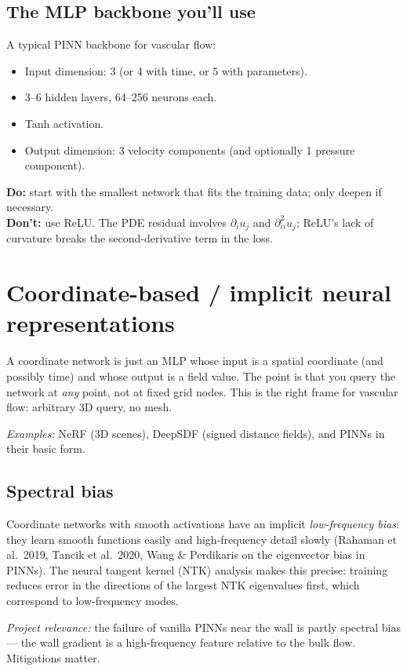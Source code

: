 \documentclass[11pt]{article}
\begin{document}
\subsection*{The MLP backbone you'll use}
A typical PINN backbone for vascular flow:
\begin{itemize}[noitemsep]
\item Input dimension: 3 (or 4 with time, or 5 with parameters).
\item 3--6 hidden layers, 64--256 neurons each.
\item Tanh activation.
\item Output dimension: 3 velocity components (and optionally 1 pressure component).
\end{itemize}

\textbf{Do:} start with the smallest network that fits the training data; only deepen if necessary.\\
\textbf{Don't:} use ReLU. The PDE residual involves $\partial_i u_j$ and $\partial^2_{ii} u_j$; ReLU's lack of curvature breaks the second-derivative term in the loss.

\section{Coordinate-based / implicit neural representations}

A coordinate network is just an MLP whose input is a spatial coordinate (and possibly time) and whose output is a field value. The point is that you query the network at \emph{any} point, not at fixed grid nodes. This is the right frame for vascular flow: arbitrary 3D query, no mesh.

\textit{Examples:} NeRF (3D scenes), DeepSDF (signed distance fields), and PINNs in their basic form.

\subsection*{Spectral bias}
Coordinate networks with smooth activations have an implicit \emph{low-frequency bias}: they learn smooth functions easily and high-frequency detail slowly (Rahaman et al.\ 2019, Tancik et al.\ 2020, Wang \& Perdikaris on the eigenvector bias in PINNs). The neural tangent kernel (NTK) analysis makes this precise: training reduces error in the directions of the largest NTK eigenvalues first, which correspond to low-frequency modes.

\textit{Project relevance:} the failure of vanilla PINNs near the wall is partly spectral bias --- the wall gradient is a high-frequency feature relative to the bulk flow. Mitigations matter.
\end{document}
